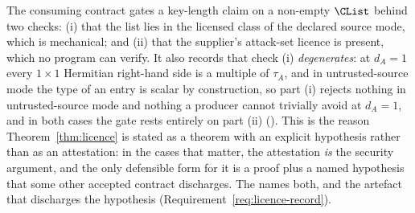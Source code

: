 
\begin{remark}
\label{rem:gateweight}
The consuming contract gates a key-length claim on a non-empty $\CList$ behind
two checks: (i) that the list lies in the licensed class of the declared source
mode, which is mechanical; and (ii) that the supplier's attack-set licence is
present, which no program can verify. It also records that check (i)
\emph{degenerates}: at $d_A=1$ every $1\times1$ Hermitian right-hand side is a
multiple of $\tau_A$, and in untrusted-source mode the type of an entry is
scalar by construction, so part (i) rejects nothing in untrusted-source mode
and nothing a producer cannot trivially avoid at $d_A=1$, and in both cases
the gate rests entirely on part (ii) (). This is the reason
Theorem~\ref{thm:licence} is stated as a theorem with an explicit hypothesis
rather than as an attestation: in the cases that matter, the attestation
\emph{is} the security argument, and the only defensible form for it is a
proof plus a named hypothesis that some other accepted contract discharges.
The  names both, and the artefact that discharges the
hypothesis (Requirement~\ref{req:licence-record}).
\end{remark}

